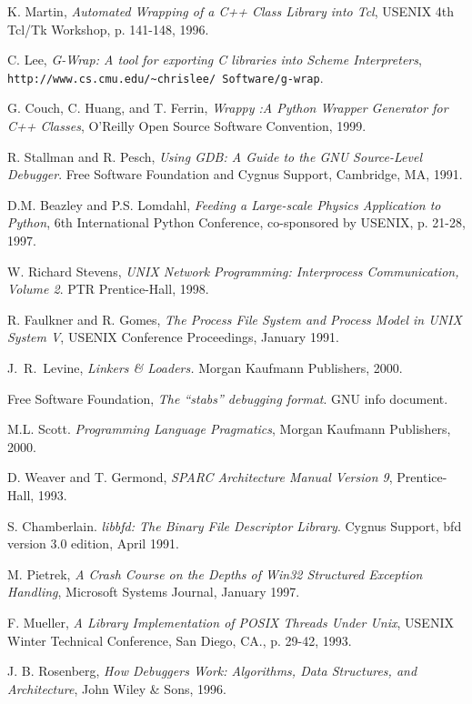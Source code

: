 \begin{thebibliography}{99}
 K. Martin, {\em Automated Wrapping of a C++ Class Library into Tcl},
USENIX 4th Tcl/Tk Workshop, p. 141-148, 1996. 

 C. Lee, {\em G-Wrap: A tool for exporting C libraries into Scheme Interpreters},\\
{\tt http://www.cs.cmu.edu/\~{ }chrislee/
Software/g-wrap}.

 G. Couch, C. Huang, and T. Ferrin, {\em Wrappy :A Python Wrapper
Generator for C++ Classes}, O'Reilly Open Source Software Convention, 1999.

 R. Stallman and R. Pesch, {\em Using GDB: A Guide to the GNU Source-Level Debugger}.
Free Software Foundation and Cygnus Support, Cambridge, MA, 1991.

 D.M. Beazley and P.S. Lomdahl, {\em Feeding a
Large-scale Physics Application to Python}, 6th International Python
Conference, co-sponsored by USENIX, p. 21-28, 1997.

 W. Richard Stevens, {\em UNIX Network Programming: Interprocess Communication, Volume 2}. PTR
Prentice-Hall, 1998. 

 R. Faulkner and R. Gomes, {\em The Process File System and Process Model in UNIX System V}, USENIX Conference Proceedings,
January 1991. 

 J.~R.~Levine, {\em Linkers \& Loaders.} Morgan Kaufmann Publishers, 2000.

 Free Software Foundation, {\em The ``stabs'' debugging format}. GNU info document.

 M.L. Scott. {\em Programming Language Pragmatics}, Morgan Kaufmann Publishers, 2000.

 D. Weaver and T. Germond, {\em SPARC Architecture Manual Version 9},
Prentice-Hall, 1993.

 S. Chamberlain. {\em libbfd: The Binary File Descriptor Library}. Cygnus Support, bfd version 3.0 edition, April 1991. 

 M. Pietrek, {\em A Crash Course on the Depths of Win32 Structured Exception Handling}, 
Microsoft Systems Journal, January 1997.

 F. Mueller, {\em A Library Implementation of POSIX Threads Under Unix},
USENIX Winter Technical Conference, San Diego, CA., p. 29-42, 1993.

 J. B. Rosenberg, {\em How Debuggers Work: Algorithms, Data Structures, and
Architecture}, John Wiley \& Sons, 1996.


\end{thebibliography}
